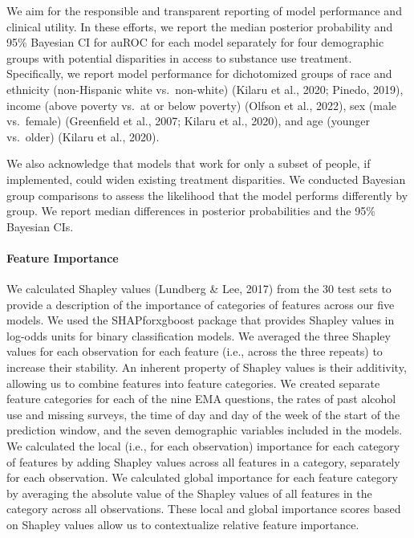 \documentclass[
]{agujournal2019}
\let\oldparagraph\paragraph
\renewcommand{\paragraph}[1]{\oldparagraph{#1}\mbox{}}
\begin{document}
We aim for the responsible and transparent reporting of model
performance and clinical utility. In these efforts, we report the median
posterior probability and 95\% Bayesian CI for auROC for each model
separately for four demographic groups with potential disparities in
access to substance use treatment. Specifically, we report model
performance for dichotomized groups of race and ethnicity (non-Hispanic
white vs.~non-white) (Kilaru et al., 2020; Pinedo, 2019), income (above
poverty vs.~at or below poverty) (Olfson et al., 2022), sex (male
vs.~female) (Greenfield et al., 2007; Kilaru et al., 2020), and age
(younger vs.~older) (Kilaru et al., 2020).

We also acknowledge that models that work for only a subset of people,
if implemented, could widen existing treatment disparities. We conducted
Bayesian group comparisons to assess the likelihood that the model
performs differently by group. We report median differences in posterior
probabilities and the 95\% Bayesian CIs.

\paragraph{Feature Importance}\label{feature-importance}

We calculated Shapley values (Lundberg \& Lee, 2017) from the 30 test
sets to provide a description of the importance of categories of
features across our five models. We used the SHAPforxgboost package that
provides Shapley values in log-odds units for binary classification
models. We averaged the three Shapley values for each observation for
each feature (i.e., across the three repeats) to increase their
stability. An inherent property of Shapley values is their additivity,
allowing us to combine features into feature categories. We created
separate feature categories for each of the nine EMA questions, the
rates of past alcohol use and missing surveys, the time of day and day
of the week of the start of the prediction window, and the seven
demographic variables included in the models. We calculated the local
(i.e., for each observation) importance for each category of features by
adding Shapley values across all features in a category, separately for
each observation. We calculated global importance for each feature
category by averaging the absolute value of the Shapley values of all
features in the category across all observations. These local and global
importance scores based on Shapley values allow us to contextualize
relative feature importance.
\end{document}
